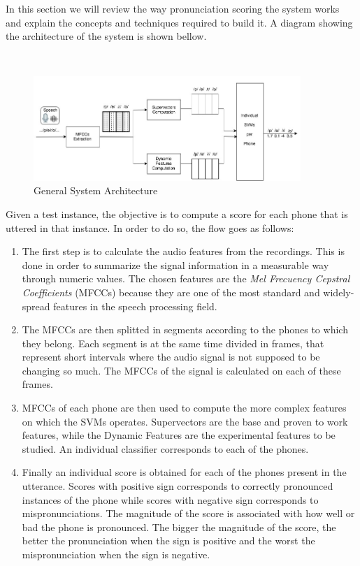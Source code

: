 In this section we will review the way pronunciation scoring the system works
and explain the concepts and techniques required to build it. A diagram showing
the architecture of the system is shown bellow.

~

\begin{figure}[H]
	\centering
	\includegraphics[width=0.9\textwidth]{files/figures/method/general-structure-v2.jpg}
	\caption{General System Architecture}
	\label{fig:methodGeneralArchitecture}
\end{figure}

Given a test instance, the objective is to compute a score for each phone that
is uttered in that instance. In order to do so, the flow goes as follows:

\begin{enumerate}
 \item The first step is to calculate the audio features from the recordings.
 This is done in order to summarize the signal information
 in a measurable way through numeric values. The chosen features
 are the \textit{Mel Frecuency Cepstral Coefficients} (MFCCs) because they are one of the
 most standard and widely-spread features in the speech processing field.
 \item The MFCCs are then splitted in segments according to the phones to which they
 belong. Each segment is at the same time divided in frames, that represent short
 intervals where the audio signal is not supposed to be changing so much. The MFCCs of
 the signal is calculated on each of these frames.
 \item MFCCs of each phone are then used to compute the more complex features
 on which the SVMs operates. Supervectors are the base and proven to work features,
 while the Dynamic Features are the experimental features to be studied.
 An individual classifier corresponds to each of the phones.
 \item Finally an individual score is obtained for each of the phones present in the
 utterance. Scores with positive sign corresponds to correctly pronounced instances of the phone
 while scores with negative sign corresponds to mispronunciations. The magnitude of the score
 is associated with how well or bad the phone is pronounced.
 The bigger the magnitude of the score, the better the pronunciation when the sign is positive
 and the worst the mispronunciation when the sign is negative.
\end{enumerate}

